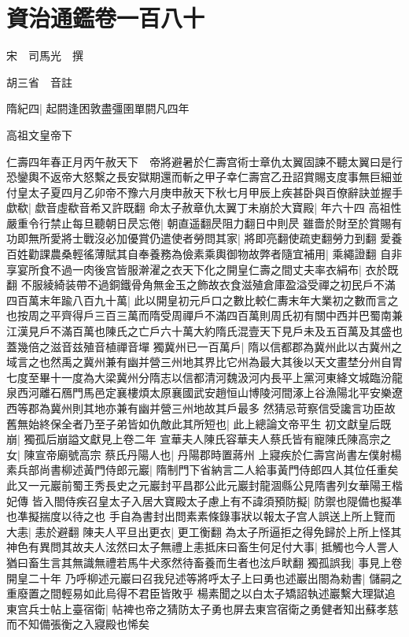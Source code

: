 \chapter{資治通鑑卷一百八十}
宋　司馬光　撰

胡三省　音註

隋紀四|{
	起閼逢困敦盡彊圉單閼凡四年}


高祖文皇帝下

仁壽四年春正月丙午赦天下　帝將避暑於仁壽宫術士章仇太翼固諫不聽太翼曰是行恐鑾輿不返帝大怒繫之長安獄期還而斬之甲子幸仁壽宫乙丑詔賞賜支度事無巨細並付皇太子夏四月乙卯帝不豫六月庚申赦天下秋七月甲辰上疾甚卧與百僚辭訣並握手歔欷|{
	歔音虛欷音希又許既翻}
命太子赦章仇太翼丁未崩於大寶殿|{
	年六十四}
高祖性嚴重令行禁止每旦聽朝日昃忘倦|{
	朝直遥翻昃阻力翻日中則昃}
雖嗇於財至於賞賜有功即無所愛將士戰沒必加優賞仍遣使者勞問其家|{
	將即亮翻使疏吏翻勞力到翻}
愛養百姓勸課農桑輕徭薄賦其自奉養務為儉素乘輿御物故弊者隨宜補用|{
	乘繩證翻}
自非享宴所食不過一肉後宫皆服澣濯之衣天下化之開皇仁壽之間丈夫率衣絹布|{
	衣於既翻}
不服綾綺装帶不過銅鐵骨角無金玉之飾故衣食滋殖倉庫盈溢受禪之初民戶不滿四百萬末年踰八百九十萬|{
	此以開皇初元戶口之數比較仁夀末年大業初之數而言之也按周之平齊得戶三百三萬而隋受周禪戶不滿四百萬則周氏初有關中西并巴蜀南兼江漢見戶不滿百萬也陳氏之亡戶六十萬大約隋氏混壹天下見戶未及五百萬及其盛也蓋幾倍之滋音兹殖音植禪音墠}
獨冀州已一百萬戶|{
	隋以信都郡為冀州此以古冀州之域言之也然禹之冀州兼有幽并營三州地其界比它州為最大其後以天文畫埜分州自胃七度至畢十一度為大梁冀州分隋志以信都清河魏汲河内長平上黨河東絳文城臨汾龍泉西河離石鴈門馬邑定襄樓煩太原襄國武安趙恒山博陵河間涿上谷漁陽北平安樂遼西等郡為冀州則其地亦兼有幽并營三州地故其戶最多}
然猜忌苛察信受讒言功臣故舊無始終保全者乃至子弟皆如仇敵此其所短也|{
	此上總論文帝平生}
初文獻皇后既崩|{
	獨孤后崩謚文獻見上卷二年}
宣華夫人陳氏容華夫人蔡氏皆有寵陳氏陳高宗之女|{
	陳宣帝廟號高宗}
蔡氏丹陽人也|{
	丹陽郡時置蔣州}
上寢疾於仁壽宫尚書左僕射楊素兵部尚書柳述黃門侍郎元巖|{
	隋制門下省納言二人給事黃門侍郎四人其位任重矣此又一元巖前蜀王秀長史之元巖封平昌郡公此元巖封龍涸縣公見隋書列女華陽王楷妃傳}
皆入閤侍疾召皇太子入居大寶殿太子慮上有不諱須預防擬|{
	防禦也隄備也擬凖也凖擬揣度以待之也}
手自為書封出問素素條錄事狀以報太子宫人誤送上所上覽而大恚|{
	恚於避翻}
陳夫人平旦出更衣|{
	更工衡翻}
為太子所逼拒之得免歸於上所上怪其神色有異問其故夫人泫然曰太子無禮上恚抵床曰畜生何足付大事|{
	抵觸也今人詈人猶曰畜生言其無識無禮若馬牛犬豕然待畜養而生者也泫戶畎翻}
獨孤誤我|{
	事見上卷開皇二十年}
乃呼柳述元巖曰召我兒述等將呼太子上曰勇也述巖出閤為勑書|{
	儲嗣之重廢置之間輕易如此烏得不君臣皆敗乎}
楊素聞之以白太子矯詔執述巖繫大理獄追東宫兵士帖上臺宿衛|{
	帖裨也帝之猜防太子勇也屏去東宫宿衛之勇健者知出蘇孝慈而不知備張衡之入寢殿也悕矣}
